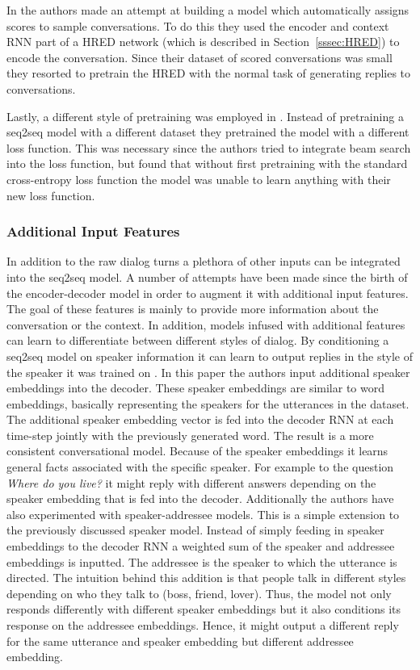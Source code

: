 \documentclass[12pt]{article}
\begin{document}
In \cite{Lowe:2017} the authors made an attempt at building a model which automatically assigns scores to sample conversations. To do this they used the encoder and context RNN part of a HRED network (which is described in Section~\ref{sssec:HRED}) to encode the conversation. Since their dataset of scored conversations was small they resorted to pretrain the HRED with the normal task of generating replies to conversations.

Lastly, a different style of pretraining was employed in \cite{Wiseman:2016}. Instead of pretraining a seq2seq model with a different dataset they pretrained the model with a different loss function. This was necessary since the authors tried to integrate beam search into the loss function, but found that without first pretraining with the standard cross-entropy loss function the model was unable to learn anything with their new loss function.

\subsubsection{Additional Input Features} \label{sssec:priors}
In addition to the raw dialog turns a plethora of other inputs can be integrated into the seq2seq model. A number of attempts have been made since the birth of the encoder-decoder model in order to augment it with additional input features. The goal of these features is mainly to provide more information about the conversation or the context. In addition, models infused with additional features can learn to differentiate between different styles of dialog. By conditioning a seq2seq model on speaker information it can learn to output replies in the style of the speaker it was trained on \cite{Li:2016}. In this paper the authors input additional speaker embeddings into the decoder. These speaker embeddings are similar to word embeddings, basically representing the speakers for the utterances in the dataset. The additional speaker embedding vector is fed into the decoder RNN at each time-step jointly with the previously generated word. The result is a more consistent conversational model. Because of the speaker embeddings it learns general facts associated with the specific speaker. For example to the question \textit{Where do you live?} it might reply with different answers depending on the speaker embedding that is fed into the decoder. Additionally the authors have also experimented with speaker-addressee models. This is a simple extension to the previously discussed speaker model. Instead of simply feeding in speaker embeddings to the decoder RNN a weighted sum of the speaker and addressee embeddings is inputted. The addressee is the speaker to which the utterance is directed. The intuition behind this addition is that people talk in different styles depending on who they talk to (boss, friend, lover). Thus, the model not only responds differently with different speaker embeddings but it also conditions its response on the addressee embeddings. Hence, it might output a different reply for the same utterance and speaker embedding but different addressee embedding.
\end{document}
